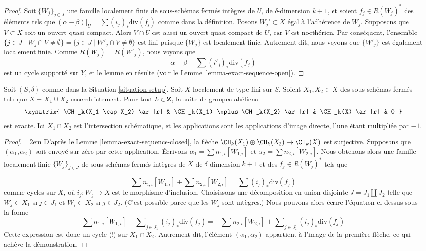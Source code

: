 \begin{proof}
Soit $\{W_j\}_{j \in J}$ une famille localement finie de sous-schémas fermés
intègres de $U$, de $\delta$-dimension $k + 1$, et soient $f_j \in R(W_j)^*$
des éléments tels que $(\alpha - \beta)|_U = \sum (i_j)_*\text{div}(f_j)$
comme dans la définition. Posons $W_j' \subset X$ égal
à l'adhérence de $W_j$. Supposons que $V \subset X$ soit un ouvert
quasi-compact. Alors $V \cap U$ est aussi un ouvert quasi-compact de $U$, car
$V$ est noethérien. Par conséquent, l'ensemble
$\{j \in J \mid W_j \cap V \not = \emptyset\}
= \{j \in J \mid W'_j \cap V \not = \emptyset\}$
est fini puisque $\{W_j\}$ est localement finie. Autrement dit, nous voyons que
$\{W'_j\}$ est également localement finie. Comme $R(W_j) = R(W'_j)$, nous voyons
que
$$
\alpha - \beta - \sum (i'_j)_*\text{div}(f_j)
$$
est un cycle supporté sur $Y$, et le lemme en résulte (voir le
Lemme \ref{lemma-exact-sequence-open}).
\end{proof}

\begin{lemma}
\label{lemma-exact-sequence-closed-chow}
Soit $(S, \delta)$ comme dans la Situation \ref{situation-setup}.
Soit $X$ localement de type fini sur $S$. Soient $X_1, X_2 \subset X$
des sous-schémas fermés tels que $X = X_1 \cup X_2$ ensemblistement.
Pour tout $k \in \mathbf{Z}$, la suite de groupes abéliens
$$
\xymatrix{
\CH_k(X_1 \cap X_2) \ar[r] &
\CH_k(X_1) \oplus \CH_k(X_2) \ar[r] &
\CH_k(X) \ar[r] &
0
}
$$
est exacte. Ici $X_1 \cap X_2$ est l'intersection schématique, et les
applications sont les applications d'image directe, l'une étant multipliée par $-1$.
\end{lemma}

\begin{proof}
{\emergencystretch=2em D'après le Lemme \ref{lemma-exact-sequence-closed}, la flèche
$\CH_k(X_1) \oplus \CH_k(X_2) \to \CH_k(X)$ est surjective.
Supposons que $(\alpha_1, \alpha_2)$ soit envoyé sur zéro par cette application.
Écrivons $\alpha_1 = \sum n_{1, i}[W_{1, i}]$ et
$\alpha_2 = \sum n_{2, i}[W_{2, i}]$. Nous obtenons alors une famille
localement finie $\{W_j\}_{j \in J}$ de sous-schémas fermés intègres
de $X$ de $\delta$-dimension $k + 1$ et des $f_j \in R(W_j)^*$
tels que\par}
$$
\sum n_{1, i}[W_{1, i}] + \sum n_{2, i}[W_{2, i}] = \sum (i_j)_*\text{div}(f_j)
$$
comme cycles sur $X$, où $i_j : W_j \to X$ est le morphisme d'inclusion.
Choisissons une décomposition en union disjointe $J = J_1 \amalg J_2$ telle que
$W_j \subset X_1$ si $j \in J_1$ et $W_j \subset X_2$ si $j \in J_2$.
(C'est possible parce que les $W_j$ sont intègres.) Nous pouvons alors écrire
l'équation ci-dessus sous la forme
$$
\sum n_{1, i}[W_{1, i}] - \sum\nolimits_{j \in J_1} (i_j)_*\text{div}(f_j) =
- \sum n_{2, i}[W_{2, i}] + \sum\nolimits_{j \in J_2} (i_j)_*\text{div}(f_j)
$$
Cette expression est donc un cycle (!) sur $X_1 \cap X_2$. Autrement dit,
l'élément $(\alpha_1, \alpha_2)$ appartient à l'image de la première flèche,
ce qui achève la démonstration.
\end{proof}

